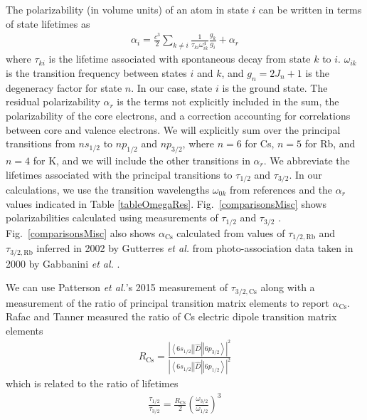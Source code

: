 \documentclass[twocolumn,prl,showpacs,superscriptaddress]{revtex4-1}   %
\newcommand{\brakett}[3]{\left.\left\langle #1 \right|\right|#2\left|\left| #3 \right\rangle\right.}
\newcommand{\figref}[1]{Fig.~\ref{#1}}
\newcommand{\acs}{\alpha_{\textrm{Cs}}}
\newcommand{\rcs}{R_{\mathrm{Cs}}}
\newcommand{\etal}{\textit{et al.}}
\newcommand{\etalspace}{\textit{et al. }}
\begin{document}
The polarizability (in volume units) of an atom in state $i$ can be written in terms of state lifetimes as
\begin{align}
	\alpha_i = \frac{c^3}{2} \sum_{k\neq i} 
	\frac{1}{\tau_{ki} \omega_{ik}^4} \frac{g_k}{g_i}
	+ \alpha_r
	\label{polFromLifetimes}
\end{align}
where $\tau_{ki}$ is the lifetime associated with spontaneous decay from state $k$ to $i$. $\omega_{ik}$ is the transition frequency between states $i$ and $k$, and $g_n = 2J_n+1$ is the degeneracy factor for state $n$. In our case, state $i$ is the ground state. 
The residual polarizability $\alpha_r$ is the terms not explicitly included in the sum, the polarizability of the core electrons, and a correction accounting for correlations between core and valence electrons.
We will explicitly sum over the principal transitions from $ns_{1/2}$ to $np_{1/2}$ and $np_{3/2}$, where $n=6$ for Cs, $n=5$ for Rb, and $n=4$ for K, and we will include the other transitions in $\alpha_r$.
We abbreviate the lifetimes associated with the principal transitions to $\tau_{1/2}$ and $\tau_{3/2}$.
In our calculations, we use the transition wavelengths $\omega_{0k}$ from references 
\cite{Gerginov2005,Gerginov2006,Falke2006,Johansson1961} 
and the $\alpha_r$ values indicated in Table \ref{tableOmegaRes}.
\figref{comparisonsMisc} shows polarizabilities calculated using measurements of $\tau_{1/2}$ and $\tau_{3/2}$
\cite{Young1994,Rafac1999,Bouloufa2007,Falke2006a,Volz2006,Simsarian1998,Wang1997}.
\figref{comparisonsMisc} also shows $\acs$ calculated from 
values of $\tau_{1/2,\mathrm{Rb}}$ and $\tau_{3/2,\mathrm{Rb}}$ inferred in 2002 by Gutterres \etalspace from photo-association data taken in 2000 by Gabbanini \etalspace \cite{Gabbanini2000,Gutterres2002}.

We can use Patterson \etal's 2015 measurement of $\tau_{3/2,\mathrm{Cs}}$ \cite{Patterson2015} along with a measurement of the ratio of principal transition matrix elements to report $\acs$.
Rafac and Tanner measured the ratio of Cs electric dipole transition matrix elements \cite{Rafac1998}
\begin{align}
	\rcs = \frac
	{\left|\brakett{6s_{1/2}}{\hat{D}}{6p_{3/2}}\right|^2}
	{\left|\brakett{6s_{1/2}}{\hat{D}}{6p_{1/2}}\right|^2}
	\label{polFromLifetimes}
\end{align}
which is related to the ratio of lifetimes
\begin{align}
	\frac{\tau_{1/2}}{\tau_{3/2}} = \frac{\rcs}{2} \left( \frac{\omega_{3/2}}{\omega_{1/2}} \right)^3
	\label{RafacRLifetimes}
\end{align}
\end{document}

